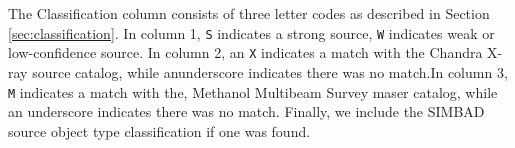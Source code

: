 \begin{table}[htp]
{\begin{tabular}{lllllllllll}
\hline
\end{tabular}
}\par
The Classification column consists of three letter codes as described in Section \ref{sec:classification}.  In column 1, \texttt{S} indicates a strong source, \texttt{W} indicates weak or low-confidence source. In column 2, an \texttt{X} indicates a match with the \citet{Muno2009a} Chandra X-ray source catalog, while anunderscore indicates there was no match.In column 3, \texttt{M} indicates a match with the, \citet{Caswell2010a} Methanol Multibeam Survey \methanol maser catalog, while an underscore indicates there was no match.  Finally, we include the SIMBAD \citep{Wenger2000a} source object type classification if one was found.
\end{table}
